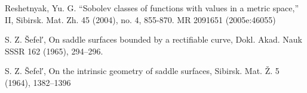 \documentclass[a4paper,10pt]{amsart}
\begin{document}
\begin{thebibliography}{52}
Reshetnyak, Yu. G. ``Sobolev classes of functions with values in a metric space,'' II, Sibirsk. Mat. Zh. 45 (2004), no. 4, 855-870. MR 2091651 (2005e:46055)

 S. Z. \v{S}efel′, On saddle surfaces bounded by a rectifiable curve, Dokl. Akad. Nauk SSSR 162 (1965), 294--296.

 S. Z. \v{S}efel′, On the intrinsic geometry of saddle surfaces, Sibirsk. Mat. Ž. 5 (1964), 1382--1396



\end{thebibliography}
\end{document}
